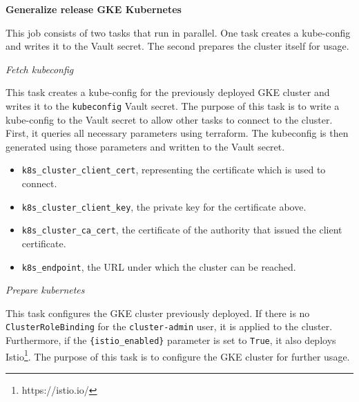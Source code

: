 \textbf{Generalize release GKE Kubernetes}

This job consists of two tasks that run in parallel.
One task creates a kube-config and writes it to the Vault secret.
The second prepares the cluster itself for usage.

\textit{Fetch kubeconfig}

This task creates a kube-config for the previously deployed GKE cluster and writes it to the \verb|kubeconfig| Vault secret.
The purpose of this task is to write a kube-config to the Vault secret to allow other tasks to connect to the cluster.
First, it queries all necessary parameters using terraform.
The kubeconfig is then generated using those parameters and written to the Vault secret.

\begin{itemize}
    \item \verb|k8s_cluster_client_cert|, representing the certificate which is used to connect.
    \item \verb|k8s_cluster_client_key|, the private key for the certificate above.
    \item \verb|k8s_cluster_ca_cert|, the certificate of the authority that issued the client certificate.
    \item \verb|k8s_endpoint|, the URL under which the cluster can be reached.
\end{itemize}

\textit{Prepare kubernetes}

This task configures the GKE cluster previously deployed.
If there is no \verb|ClusterRoleBinding| for the \verb|cluster-admin| user, it is applied to the cluster.
Furthermore, if the \verb|{istio_enabled}| parameter is set to \verb|True|, it also deploys Istio\footnote{https://istio.io/}.
The purpose of this task is to configure the GKE cluster for further usage.

